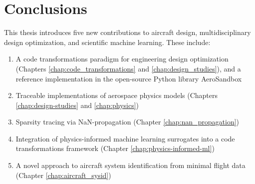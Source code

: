 \chapter{Conclusions}

This thesis introduces five new contributions to aircraft design, multidisciplinary design optimization, and scientific machine learning. These include:

\begin{enumerate}[noitemsep]
    \item A code transformations paradigm for engineering design optimization (Chapters \ref{chap:code_transformations} and \ref{chap:design_studies}), and a reference implementation in the open-source Python library AeroSandbox \cite{asb_github}
    \item Traceable implementations of aerospace physics models (Chapters \ref{chap:design-studies} and \ref{chap:physics})
    \item Sparsity tracing via NaN-propagation (Chapter \ref{chap:nan_propagation})
    \item Integration of physics-informed machine learning surrogates into a code transformations framework (Chapter \ref{chap:physics-informed-ml})
    \item A novel approach to aircraft system identification from minimal flight data (Chapter \ref{chap:aircraft_sysid})
\end{enumerate}

